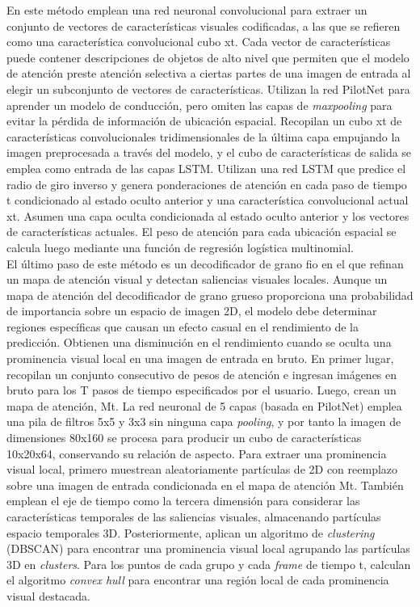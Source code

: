 En este método emplean una red neuronal convolucional para extraer un conjunto de vectores de características visuales codificadas, a las que se refieren como una característica convolucional cubo xt. Cada vector de características puede contener descripciones de objetos de alto nivel que permiten que el modelo de atención preste atención selectiva a ciertas partes de una imagen de entrada al elegir un subconjunto de vectores de características. Utilizan la red PilotNet \cite{end2end} para aprender un modelo de conducción, pero omiten las capas de \textit{maxpooling} para evitar la pérdida de información de ubicación espacial. Recopilan un cubo xt de características convolucionales tridimensionales de la última capa empujando la imagen preprocesada a través del modelo, y el cubo de características de salida se emplea como entrada de las capas LSTM. Utilizan una red LSTM que predice el radio de giro inverso y genera ponderaciones de atención en cada paso de tiempo t condicionado al estado oculto anterior y una característica convolucional actual xt. Asumen una capa oculta condicionada al estado oculto anterior y los vectores de características actuales. El peso de atención para cada ubicación espacial se calcula luego mediante una función de regresión logística multinomial.\\

El último paso de este método es un decodificador de grano fio en el que refinan un mapa de atención visual y detectan saliencias visuales locales. Aunque un mapa de atención del decodificador de grano grueso proporciona una probabilidad de importancia sobre un espacio de imagen 2D, el modelo debe determinar regiones específicas que causan un efecto casual en el rendimiento de la predicción. Obtienen una disminución en el rendimiento cuando se oculta una prominencia visual local en una imagen de entrada en bruto. En primer lugar, recopilan un conjunto consecutivo de pesos de atención e ingresan imágenes en bruto para los T pasos de  tiempo especificados por el usuario. Luego, crean un mapa de atención, Mt. La red neuronal de 5 capas (basada en PilotNet) emplea una pila de filtros 5x5 y 3x3 sin ninguna capa \textit{pooling}, y por tanto la imagen de dimensiones 80x160 se procesa para producir un cubo de características 10x20x64, conservando su relación de aspecto. Para extraer una prominencia visual local, primero muestrean aleatoriamente partículas de 2D con reemplazo sobre una imagen de entrada condicionada en el mapa de atención Mt. También emplean el eje de tiempo como la tercera dimensión para considerar las características temporales de las saliencias visuales, almacenando partículas espacio temporales 3D. Posteriormente, aplican un algoritmo de \textit{clustering} (DBSCAN) para encontrar una prominencia visual local agrupando las partículas 3D en \textit{clusters}. Para los puntos de cada grupo y cada \textit{frame} de tiempo t, calculan el algoritmo \textit{convex hull} para encontrar una región local de cada prominencia visual destacada.\\

